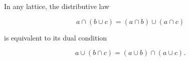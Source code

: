 In any lattice, the distributive law

$$a \cap (b \cup c) = (a \cap b) \cup (a \cap c)$$

is equivalent to its dual condition

$$a \cup (b \cap c) = (a \cup b) \cap (a \cup c).$$
